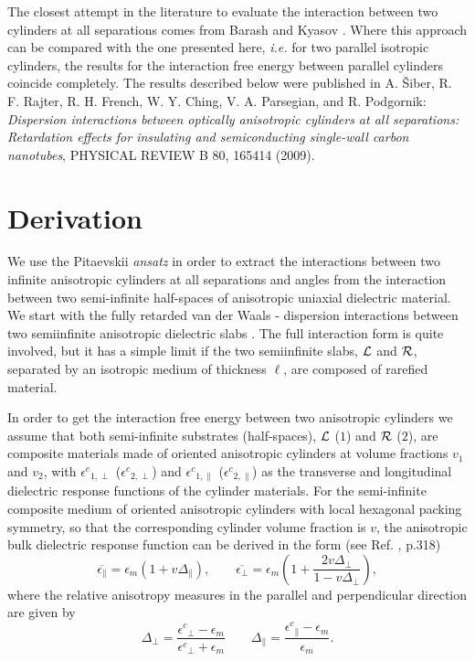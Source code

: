 \documentclass[onecolumn,letterpaper,amsmath,amssymb,floatfix,aps,superscriptaddress]{revtex4}
\begin{document}
The closest attempt in the literature to evaluate the interaction between two cylinders at all separations comes from Barash and Kyasov \cite{Barash89}.  Where this approach can be compared with the one presented here, {\sl i.e.} for two parallel isotropic cylinders, the results for the interaction free energy between parallel cylinders coincide completely. The results described below were published in A. \v Siber, R. F. Rajter, R. H. French, W. Y. Ching, V. A. Parsegian, and R. Podgornik: {\sl Dispersion interactions between optically anisotropic cylinders at all separations: Retardation effects for insulating and semiconducting single-wall carbon nanotubes}, PHYSICAL REVIEW B 80, 165414 (2009).

\section{Derivation}

We use the Pitaevskii {\sl ansatz} in order to extract the interactions between two infinite anisotropic cylinders at all separations and angles from the interaction between 
two semi-infinite half-spaces of anisotropic uniaxial dielectric material. We start with the fully retarded van der Waals - dispersion interactions between two semiinfinite anisotropic 
dielectric slabs \cite{Barash}. The full interaction form is quite involved, but it has a simple limit if the two semiinfinite slabs, ${\cal L}$ and ${\cal R}$, separated by an isotropic medium of thickness $\ell$, are composed of rarefied material. 

In order to get the interaction free energy between two anisotropic cylinders we assume that both semi-infinite substrates (half-spaces), ${\cal L}$ ($1$) and ${\cal R}$ ($2$), are 
composite materials made of oriented anisotropic cylinders at volume fractions $v_1$ and $v_2$, with ${\epsilon^{c}}_{1,\perp}$ (${\epsilon^{c}}_{2,\perp}$) 
and ${\epsilon^{c}}_{1,\parallel}$ (${\epsilon^{c}}_{2,\parallel}$) as the transverse and longitudinal
dielectric response functions of the cylinder materials. For the semi-infinite composite medium of oriented anisotropic cylinders with local hexagonal  packing symmetry, so that the corresponding cylinder volume fraction is $v$, the anisotropic bulk dielectric response function can be derived in the
form (see Ref. , p.318) 
\begin{equation}
\overline{\epsilon_{\parallel}}=\epsilon_{m}\left(1+v\Delta_{\parallel}\right),\qquad\overline{\epsilon_{\perp}}=\epsilon_{m}\left(1+\frac{2v\Delta_{\perp}}{1-v\Delta_{\perp}}\right),\label{eq:v_dependance}
\end{equation}
where the relative anisotropy measures in the parallel and perpendicular direction are given by
\begin{equation}
\Delta_{\perp}=\frac{{\epsilon^{c}}_{\perp}-\epsilon_{m}}{{\epsilon^{c}}_{\perp}+\epsilon_{m}}\qquad\Delta_{\parallel}=\frac{{\epsilon^{c}}_{\parallel}-\epsilon_{m}}{\epsilon_{m}}.
\label{anisoind}
\end{equation}
\end{document}
